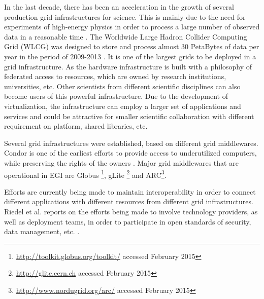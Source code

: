 In the last decade, there has been an acceleration in the growth of several production grid infrastructures for science. This is mainly due to the need for experiments of high-energy physics in order to process a large number of observed data in a reasonable time \cite{Bird2009}. The Worldwide Large Hadron Collider Computing Grid (WLCG) was designed to store and process almost 30 PetaBytes of data per year in the period of 2009-2013  \cite{Adamova2014}. It is one of the largest grids to be deployed in a grid infrastructure. As the hardware infrastructure is built with a philosophy of federated access to resources, which are owned by research institutions, universities, etc. Other scientists from different scientific disciplines can also become users of this powerful infrastructure. Due to the development of virtualization, the infrastructure can employ a larger set of applications and services and could be attractive for smaller scientific collaboration with different requirement on platform, shared libraries, etc.

Several grid infrastructures were established, based on different grid middlewares.
Condor is one of the earliest efforts to provide access to underutilized computers, while preserving the rights of the owners \cite{Litzkow1990}. Major grid middlewares that are operational in EGI are Globus \cite{Foster1997}\footnote{\url{http://toolkit.globus.org/toolkit/} accessed February 2015}, gLite \cite{Laure2006}\footnote{\url{http://glite.cern.ch} accessed February 2015} and ARC\footnote{\url{http://www.nordugrid.org/arc/} accessed February 2015}.

Efforts are currently being made to maintain interoperability in order to connect different applications with different resources from different grid infrastructures. Riedel et al. reports on the efforts being made to involve technology providers, as well as deployment teams, in order to participate in open standards of security, data management, etc. \cite{Riedel2009}.

